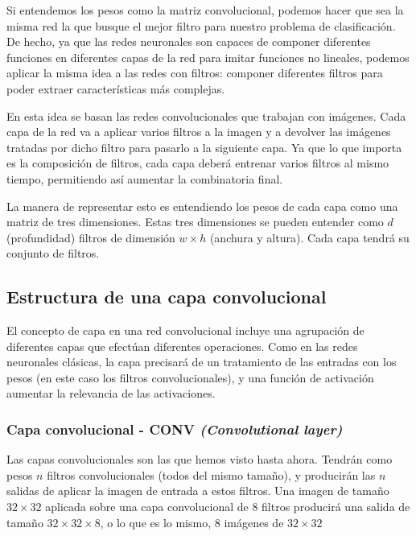 Si entendemos los pesos como la matriz convolucional, podemos hacer que sea la misma red la que busque el mejor filtro para nuestro problema de clasificación. De hecho, ya que las redes neuronales son capaces de componer diferentes funciones en diferentes capas de la red para imitar funciones no lineales, podemos aplicar la misma idea a las redes con filtros: componer diferentes filtros para poder extraer características más complejas.

En esta idea se basan las redes convolucionales que trabajan con imágenes. Cada capa de la red va a aplicar varios filtros a la imagen y a devolver las imágenes tratadas por dicho filtro para pasarlo a la siguiente capa. Ya que lo que importa es la composición de filtros, cada capa deberá entrenar varios filtros al mismo tiempo, permitiendo así aumentar la combinatoria final.

\begin{center}
\end{center}

La manera de representar esto es entendiendo los pesos de cada capa como una matriz de tres dimensiones. Estas tres dimensiones se pueden entender como $d$ (profundidad) filtros de dimensión  $w \times h$ (anchura y altura). Cada capa tendrá su conjunto de filtros.

\subsection{Estructura de una capa convolucional}

El concepto de capa en una red convolucional incluye una agrupación de diferentes capas que efectúan diferentes operaciones. Como en las redes neuronales clásicas, la capa precisará de un tratamiento de las entradas con los pesos (en este caso los filtros convolucionales), y una función de activación aumentar la relevancia de las activaciones. 

\subsubsection{Capa convolucional - CONV \textit{(Convolutional layer)}}

Las capas convolucionales son las que hemos visto hasta ahora. Tendrán como pesos $n$ filtros convolucionales (todos del mismo tamaño), y producirán las $n$ salidas de aplicar la imagen de entrada a estos filtros. Una imagen de tamaño $32\times 32$ aplicada sobre una capa convolucional de 8 filtros producirá una salida de tamaño $32 \times 32 \times 8$, o lo que es lo mismo, 8 imágenes de $32 \times 32$


